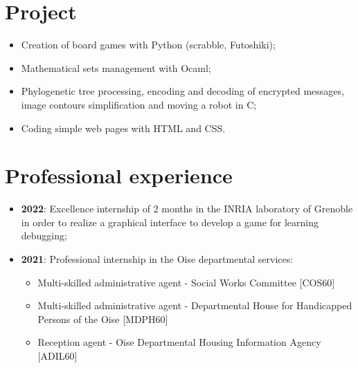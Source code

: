 \documentclass[10pt, oneside, a4paper, titlepage]{article}
\begin{document}
\begin{tcolorbox}
\begin{minipage}[t]{12cm}
\begin{tcolorbox}[grow to right by = 0.6cm, colback = gray!25, colframe = white]
                \section*{Project}
                \begin{itemize}
                    \item Creation of board games with Python (scrabble, Futoshiki);
                    \item Mathematical sets management with Ocaml;
                    \item Phylogenetic tree processing, encoding and decoding of 
                    encrypted messages, image contours simplification and moving 
                    a robot in C;
                    \item Coding simple web pages with HTML and CSS.

                \end{itemize}
                
                \section*{Professional experience}
                \begin{itemize}
                    \item \textbf{2022}: Excellence internship of 2 months in the INRIA 
                    laboratory of Grenoble in order to realize a 
                    graphical interface to develop a game for learning
                    debugging;
                    \item \textbf{2021}: Professional internship in the Oise departmental services:
                    \begin{itemize}
                        
                        \item Multi-skilled administrative agent -  Social Works Committee [COS60]
                        \item Multi-skilled administrative agent - Departmental House for Handicapped Persons of the Oise [MDPH60]
                        \item Reception agent - Oise Departmental Housing Information Agency [ADIL60]
                        
                        
                        
                    \end{itemize}
                

\end{itemize}
\end{tcolorbox}
\end{minipage}
\end{tcolorbox}
\end{document}
